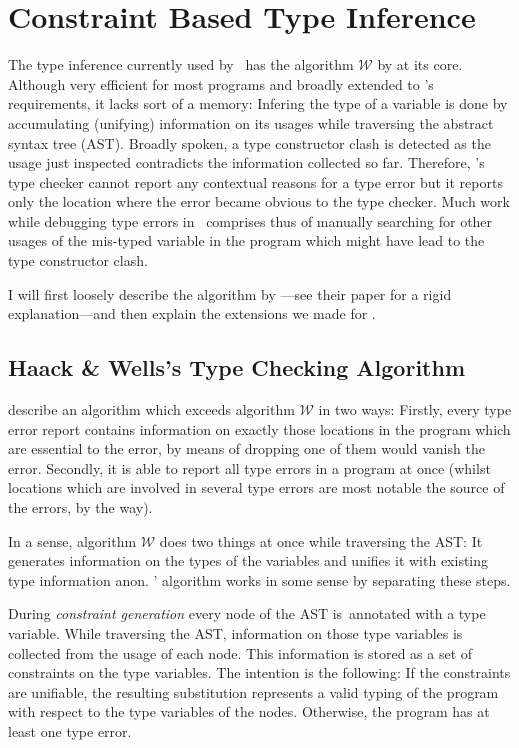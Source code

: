 
\section{Constraint Based Type Inference}
\label{sec:typeinfer}

The type inference currently used by \ocaml\ has the algorithm $\mathcal W$ by
\citet{damasmilner} at its core.
Although very efficient for most programs and broadly extended to \ocaml's 
requirements, it lacks sort of a memory:
Infering the type of a variable is done by accumulating (unifying) information
on its usages while traversing the abstract syntax tree (AST).
Broadly spoken, a type constructor clash is detected as the usage just
inspected contradicts the information collected so far.
Therefore, \ocaml's type checker cannot report any contextual reasons for a type
error but it reports only the location where the error became obvious to the
type checker.
Much work while debugging type errors in \ocaml\ comprises thus of manually
searching for other usages of the mis-typed variable in the program which might
have lead to the type constructor clash.

I will first loosely describe the algorithm by \citeauthor{haackwells04}---see
their \citeyear{haackwells04} paper for a rigid explanation---and then explain
the extensions we made for \easyocaml.


\subsection{Haack \& Wells's Type Checking Algorithm}

\citet{haackwells04} describe an algorithm which exceeds algorithm $\mathcal W$
in two ways:
Firstly, every type error report contains information on exactly those
locations in the program which are essential to the error, by means of dropping
one of them would vanish the error.
Secondly, it is able to report all type errors in a program at once (whilst
locations which are involved in several type errors are most notable the source
of the errors, by the way).

In a sense, algorithm $\mathcal W$ does two things at once while traversing the 
AST: It generates information on the types of the variables and unifies it with
existing type information anon.  \citeauthor{haackwells04}' algorithm works in
some sense by separating these steps.

During \emph{constraint generation} every node of the AST is\wha\ annotated with
a type variable. While traversing the AST, information on those type variables
is collected from the usage of each node. This information is stored as a set of
constraints on the type variables.
The intention is the following: If the constraints are unifiable, the resulting
substitution represents a valid typing of the program with respect to the type
variables of the nodes.
Otherwise, the program has at least one type error.

